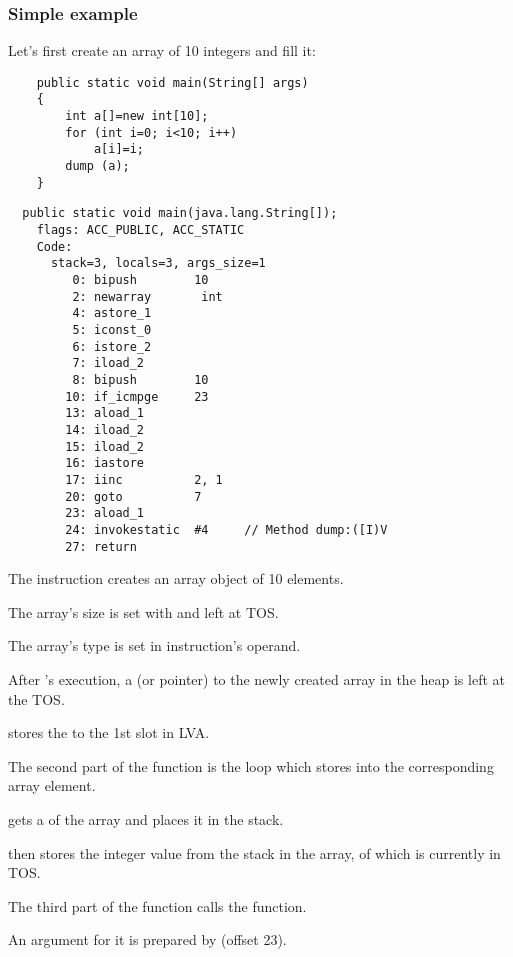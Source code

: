 \subsubsection{Simple example}

Let's first create an array of 10 integers and fill it:

\begin{lstlisting}
	public static void main(String[] args) 
	{
		int a[]=new int[10];
		for (int i=0; i<10; i++)
			a[i]=i;
		dump (a);
	}
\end{lstlisting}

\begin{lstlisting}
  public static void main(java.lang.String[]);
    flags: ACC_PUBLIC, ACC_STATIC
    Code:
      stack=3, locals=3, args_size=1
         0: bipush        10
         2: newarray       int
         4: astore_1      
         5: iconst_0      
         6: istore_2      
         7: iload_2       
         8: bipush        10
        10: if_icmpge     23
        13: aload_1       
        14: iload_2       
        15: iload_2       
        16: iastore       
        17: iinc          2, 1
        20: goto          7
        23: aload_1       
        24: invokestatic  #4     // Method dump:([I)V
        27: return        
\end{lstlisting}

The  instruction creates an array object of 10  elements.

The array's size is set with  and left at \ac{TOS}.

The array's type is set in  instruction's operand.

After 's execution, a  (or pointer) to the newly created array in the heap 
is left at the \ac{TOS}.

 stores the  to the 1st slot in \ac{LVA}.

The second part of the \main function is the loop which stores  into the corresponding
array element.

 gets a  of the array and places it in the stack.

 then stores the integer value from the stack in the array, 
 of which is currently in \ac{TOS}.

The third part of the \main function calls the  function.

An argument for it is prepared by  (offset 23).

